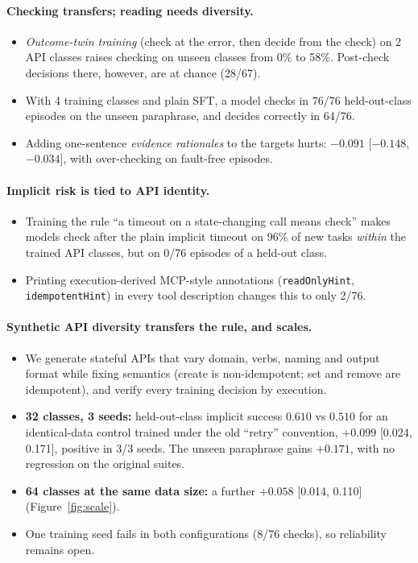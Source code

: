 \documentclass[11pt]{article}
\begin{document}
\paragraph{Checking transfers; reading needs diversity.}
\begin{itemize}
\item \emph{Outcome-twin training} (check at the error, then decide from the check) on 2 API classes raises checking on unseen classes from 0\% to 58\%. Post-check decisions there, however, are at chance (28/67).
\item With 4 training classes and plain SFT, a model checks in 76/76 held-out-class episodes on the unseen paraphrase, and decides correctly in 64/76.
\item Adding one-sentence \emph{evidence rationales} to the targets hurts: $-0.091$ [$-0.148$, $-0.034$], with over-checking on fault-free episodes.
\end{itemize}

\paragraph{Implicit risk is tied to API identity.}
\begin{itemize}
\item Training the rule ``a timeout on a state-changing call means check'' makes models check after the plain implicit timeout on 96\% of new tasks \emph{within} the trained API classes, but on 0/76 episodes of a held-out class.
\item Printing execution-derived MCP-style annotations (\texttt{readOnlyHint}, \texttt{idempotentHint}) \citep{TODO_mcp} in every tool description changes this to only 2/76.
\end{itemize}

\paragraph{Synthetic API diversity transfers the rule, and scales.}
\begin{itemize}
\item We generate stateful APIs that vary domain, verbs, naming and output format while fixing semantics (create is non-idempotent; set and remove are idempotent), and verify every training decision by execution.
\item \textbf{32 classes, 3 seeds:} held-out-class implicit success $0.610$ vs $0.510$ for an identical-data control trained under the old ``retry'' convention, $+0.099$ [0.024, 0.171], positive in 3/3 seeds. The unseen paraphrase gains $+0.171$, with no regression on the original suites.
\item \textbf{64 classes at the same data size:} a further $+0.058$ [0.014, 0.110] (Figure~\ref{fig:scale}).
\item One training seed fails in both configurations (8/76 checks), so reliability remains open.
\end{itemize}
\end{document}
